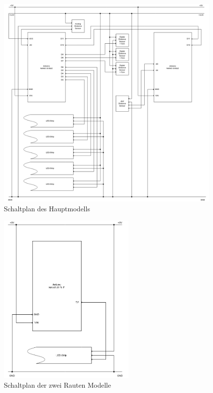     \begin{figure}[H]
        \begin{center}
            \includegraphics[width=\textwidth]{media/03_technical_implementation/circuit_diagram_transmitter.png}
        \end{center}
        \caption{Schaltplan des Hauptmodells}
        \label{fig:circuit_diagram_transmitter}
    \end{figure}

    \begin{figure}[H]
        \begin{center}
            \includegraphics[width=6.8cm]{media/03_technical_implementation/circuit_diagram_receiver.png}
        \end{center}
        \caption{Schaltplan der zwei Rauten Modelle}
        \label{fig:circuit_diagram_receiver}
    \end{figure}

